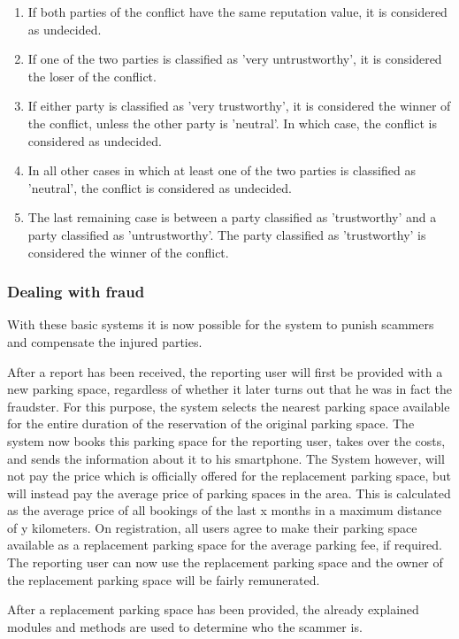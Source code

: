 \documentclass[
a4paper,     %
titlepage,   %
14pt         %
]{scrartcl}  %
\theoremstyle{mystyle}
\begin{document}
\begin{enumerate}
\item If both parties of the conflict have the same reputation value, it is considered as undecided.
\item If one of the two parties is classified as 'very untrustworthy', it is considered the loser of the conflict.
\item If either party is classified as 'very trustworthy', it is considered the winner of the conflict, unless the other party is 'neutral'. In which case, the conflict is considered as undecided.
\item In all other cases in which at least one of the two parties is classified as 'neutral', the conflict is considered as undecided.
\item The last remaining case is between a party classified as 'trustworthy' and a party classified as 'untrustworthy'. The party classified as 'trustworthy' is considered the winner of the conflict.
\end{enumerate}

\subsubsection{Dealing with fraud} With these basic systems it is now possible for the system to punish scammers and compensate the injured parties. 

After a report has been received, the reporting user will first be provided with a new parking space, regardless of whether it later turns out that he was in fact the fraudster. For this purpose, the system selects the nearest parking space available for the entire duration of the reservation of the original parking space. The system now books this parking space for the reporting user, takes over the costs, and sends the information about it to his smartphone. The System however, will not pay the price which is officially offered for the replacement parking space, but will instead pay the average price of parking spaces in the area. This is calculated as the average price of all bookings of the last x months in a maximum distance of y kilometers. On registration, all users agree to make their parking space available as a replacement parking space for the average parking fee, if required. The reporting user can now use the replacement parking space and the owner of the replacement parking space will be fairly remunerated.

After a replacement parking space has been provided, the already explained modules and methods are used to determine who the scammer is.
\end{document}
